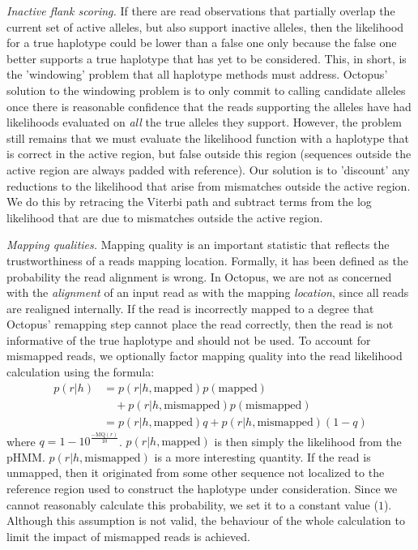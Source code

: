 \documentclass[notitlepage, twocolumn, 10pt]{article}
\begin{document}
\vspace{3mm}
\noindent\emph{Inactive flank scoring.} If there are read observations that partially overlap the current set of active alleles, but also support inactive alleles, then the likelihood for a true haplotype could be lower than a false one only because the false one better supports a true haplotype that has yet to be considered. This, in short, is the 'windowing' problem that all haplotype methods must address. Octopus' solution to the windowing problem is to only commit to calling candidate alleles once there is reasonable confidence that the reads supporting the alleles have had likelihoods evaluated on \emph{all} the true alleles they support. However, the problem still remains that we must evaluate the likelihood function with a haplotype that is correct in the active region, but false outside this region (sequences outside the active region are always padded with reference). Our solution is to 'discount' any reductions to the likelihood that arise from mismatches outside the active region. We do this by retracing the Viterbi path and subtract terms from the log likelihood that are due to mismatches outside the active region.

\vspace{3mm}
\noindent\emph{Mapping qualities.} Mapping quality is an important statistic that reflects the trustworthiness of a reads mapping location. Formally, it has been defined as the probability the read alignment is wrong. In Octopus, we are not as concerned with the \emph{alignment} of an input read as with the mapping \emph{location}, since all reads are realigned internally. If the read is incorrectly mapped to a degree that Octopus' remapping step cannot place the read correctly, then the read is not informative of the true haplotype and should not be used. To account for mismapped reads, we optionally factor mapping quality into the read likelihood calculation using the formula:
\begin{align*}
	p(r | h) &= p(r | h, \text{mapped})p(\text{mapped}) \\
              & \quad + p(r | h, \text{mismapped})p(\text{mismapped})\\
	         &= p(r | h, \text{mapped})q + p(r | h, \text{mismapped})(1 - q)
\end{align*}
where $q = 1 - 10^{\frac{-\text{MQ}(r)}{10}}$. $p(r | h, \text{mapped})$ is then simply the likelihood from the pHMM. $p(r | h, \text{mismapped})$ is a more interesting quantity. If the read is unmapped, then it originated from some other sequence not localized to the reference region used to construct the haplotype under consideration. Since we cannot reasonably calculate this probability, we set it to a constant value ($1$). Although this assumption is not valid, the behaviour of the whole calculation to limit the impact of mismapped reads is achieved.
\end{document}
